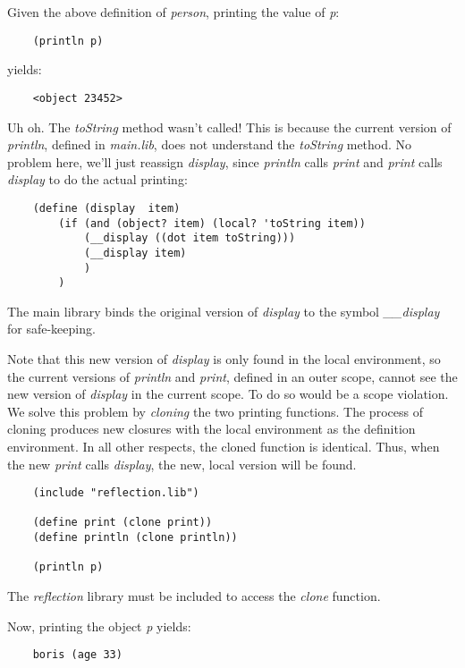 Given the above definition of {\it person}, printing the value of {\it p}:

\begin{verbatim}
    (println p)
\end{verbatim}

yields:

\begin{verbatim}
    <object 23452>
\end{verbatim}

Uh oh. The {\it toString} method wasn't called! This is because
the current version of {\it println}, defined in {\it main.lib},
does not understand the {\it toString}
method. No problem here, we'll just reassign {\it display},
since {\it println} calls {\it print} and {\it print} calls {\it display}
to do the actual printing:

\begin{verbatim}
    (define (display  item)
        (if (and (object? item) (local? 'toString item))
            (__display ((dot item toString)))
            (__display item)
            )
        )
\end{verbatim}

The main library binds the original version of {\it display}
to the symbol {\it \_\_display} for
safe-keeping.

Note that this new version of {\it display} is only found in the local
environment, so the current versions of {\it println} and {\it print}, defined
in an outer scope, cannot see the new version of {\it display} in the current
scope.
To do so would be a scope violation.
We solve this problem by {\it cloning} the two printing functions.
The process of cloning produces new closures with 
the local environment as the definition environment.
In all other respects, the cloned function is identical.
Thus, when the new {\it print} calls {\it display}, the new, local version 
will be found.

\begin{verbatim}
    (include "reflection.lib")

    (define print (clone print))
    (define println (clone println))

    (println p)
\end{verbatim}

The {\it reflection} library must be included
to access the {\it clone} function.

Now, printing the object {\it p} yields:

\begin{verbatim}
    boris (age 33)
\end{verbatim}
